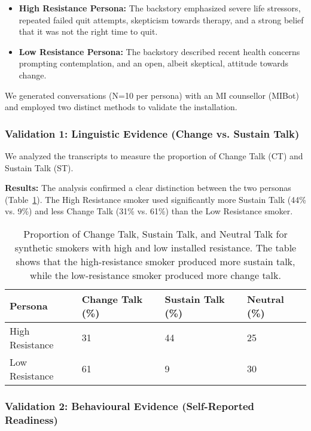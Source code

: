 \begin{itemize}
    \item \textbf{High Resistance Persona:} The backstory emphasized severe life stressors, repeated failed quit attempts, skepticism towards therapy, and a strong belief that it was not the right time to quit.
    \item \textbf{Low Resistance Persona:} The backstory described recent health concerns prompting contemplation, and an open, albeit skeptical, attitude towards change.
\end{itemize}

We generated conversations (N=10 per persona) with an MI counsellor (MIBot) and employed two distinct methods to validate the installation.

\subsubsection{Validation 1: Linguistic Evidence (Change vs. Sustain Talk)}

We analyzed the transcripts to measure the proportion of Change Talk (CT) and Sustain Talk (ST).

\textbf{Results:} The analysis confirmed a clear distinction between the two personas (Table~\ref{tab:resistance-ct-st}). The High Resistance smoker used significantly more Sustain Talk (44\% vs. 9\%) and less Change Talk (31\% vs. 61\%) than the Low Resistance smoker.

\begin{table}[h!]
\centering
\caption[Change and Sustain Talk for High/Low Resistance Smokers]{Proportion of Change Talk, Sustain Talk, and Neutral Talk for synthetic smokers with high and low installed resistance. The table shows that the high-resistance smoker produced more sustain talk, while the low-resistance smoker produced more change talk.}
\label{tab:resistance-ct-st}
\begin{tabular}{@{}llll@{}}
\toprule
\textbf{Persona} & \textbf{Change Talk (\%)} & \textbf{Sustain Talk (\%)} & \textbf{Neutral (\%)} \\ \midrule
High Resistance & 31 & 44 & 25 \\
Low Resistance & 61 & 9 & 30 \\ \bottomrule
\end{tabular}
\end{table}

\subsubsection{Validation 2: Behavioural Evidence (Self-Reported Readiness)}


